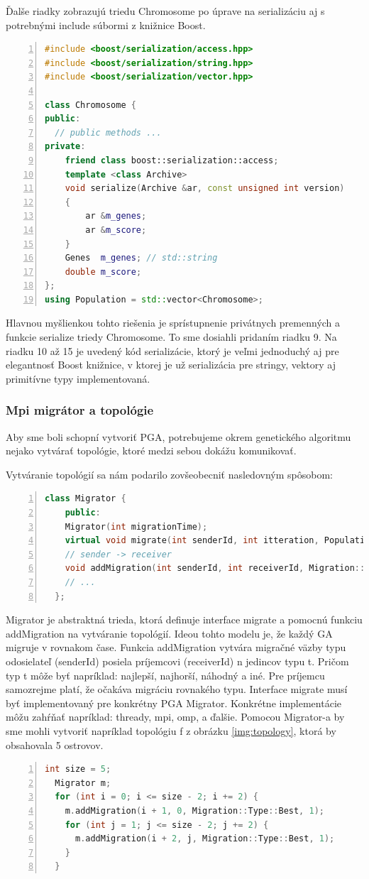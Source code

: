 Ďalše riadky zobrazujú triedu Chromosome po úprave na serializáciu aj s potrebnými include súbormi z knižnice Boost.
\begin{lstlisting}[language={c++}, numbers={left}]
#include <boost/serialization/access.hpp>
#include <boost/serialization/string.hpp>
#include <boost/serialization/vector.hpp>

class Chromosome {
public:
  // public methods ...
private:
    friend class boost::serialization::access;
    template <class Archive>
    void serialize(Archive &ar, const unsigned int version)
    {
        ar &m_genes;
        ar &m_score;
    }
    Genes  m_genes; // std::string
    double m_score;
};
using Population = std::vector<Chromosome>;
\end{lstlisting}
Hlavnou myšlienkou tohto riešenia je sprístupnenie privátnych premenných a funkcie serialize triedy Chromosome. To sme dosiahli pridaním riadku 9.
Na riadku 10 až 15 je uvedený kód serializácie, ktorý je veľmi jednoduchý aj pre elegantnosť Boost knižnice, v ktorej je už serializácia pre stringy, vektory aj primitívne typy implementovaná.

\subsubsection{Mpi migrátor a topológie}
Aby sme boli schopní vytvoriť PGA, potrebujeme okrem genetického algoritmu nejako vytvárať topológie, ktoré medzi sebou dokážu komunikovať.

Vytváranie topológií sa nám podarilo zovšeobecniť nasledovným spôsobom:
\begin{lstlisting}[language=c++, caption={Abstraktná trieda Migrator}, numbers={left}]
  class Migrator {
    public:
    Migrator(int migrationTime);
    virtual void migrate(int senderId, int itteration, Population &population) = 0;
    // sender -> receiver
    void addMigration(int senderId, int receiverId, Migration::Type t, int n)
    // ...
  };
\end{lstlisting}
Migrator je abstraktná trieda, ktorá definuje interface migrate a pomocnú funkciu addMigration na vytváranie topológií.
Ideou tohto modelu je, že každý GA migruje v rovnakom čase.
Funkcia addMigration vytvára migračné väzby typu odosielateľ (senderId) posiela príjemcovi (receiverId) n jedincov typu t.
Pričom typ t môže byť napríklad: najlepší, najhorší, náhodný a iné. Pre príjemcu samozrejme platí, že očakáva migráciu rovnakého typu.
Interface migrate musí  byť implementovaný pre konkrétny PGA Migrator. Konkrétne implementácie môžu zahŕňať napríklad: thready, \acrshort{mpi}, \acrshort{omp}, a ďalšie.
Pomocou Migrator-a by sme mohli vytvoriť napríklad topológiu f z obrázku \ref{img:topology}, ktorá by obsahovala 5 ostrovov.
\begin{lstlisting}[language={c++}, numbers=left]
  int size = 5;
  Migrator m;
  for (int i = 0; i <= size - 2; i += 2) {
    m.addMigration(i + 1, 0, Migration::Type::Best, 1);
    for (int j = 1; j <= size - 2; j += 2) {
      m.addMigration(i + 2, j, Migration::Type::Best, 1);
    }
  }
\end{lstlisting}

